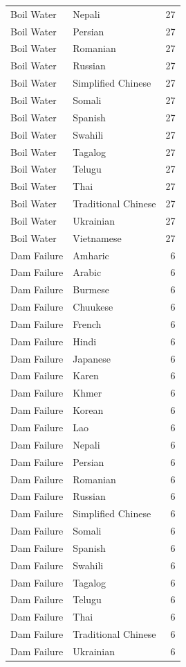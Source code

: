 \begin{longtable}{p{3cm} p{3cm} r}
Boil Water & Nepali & 27 \\
Boil Water & Persian & 27 \\
Boil Water & Romanian & 27 \\
Boil Water & Russian & 27 \\
Boil Water & Simplified Chinese & 27 \\
Boil Water & Somali & 27 \\
Boil Water & Spanish & 27 \\
Boil Water & Swahili & 27 \\
Boil Water & Tagalog & 27 \\
Boil Water & Telugu & 27 \\
Boil Water & Thai & 27 \\
Boil Water & Traditional Chinese & 27 \\
Boil Water & Ukrainian & 27 \\
Boil Water & Vietnamese & 27 \\
Dam Failure & Amharic & 6 \\
Dam Failure & Arabic & 6 \\
Dam Failure & Burmese & 6 \\
Dam Failure & Chuukese & 6 \\
Dam Failure & French & 6 \\
Dam Failure & Hindi & 6 \\
Dam Failure & Japanese & 6 \\
Dam Failure & Karen & 6 \\
Dam Failure & Khmer & 6 \\
Dam Failure & Korean & 6 \\
Dam Failure & Lao & 6 \\
Dam Failure & Nepali & 6 \\
Dam Failure & Persian & 6 \\
Dam Failure & Romanian & 6 \\
Dam Failure & Russian & 6 \\
Dam Failure & Simplified Chinese & 6 \\
Dam Failure & Somali & 6 \\
Dam Failure & Spanish & 6 \\
Dam Failure & Swahili & 6 \\
Dam Failure & Tagalog & 6 \\
Dam Failure & Telugu & 6 \\
Dam Failure & Thai & 6 \\
Dam Failure & Traditional Chinese & 6 \\
Dam Failure & Ukrainian & 6 \\

\end{longtable}
